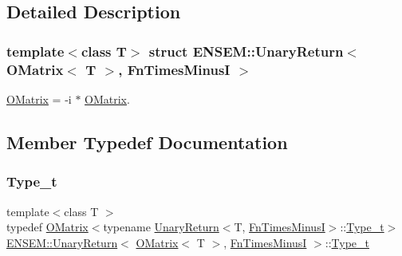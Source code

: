 \subsection{Detailed Description}
\subsubsection*{template$<$class T$>$\newline
struct E\+N\+S\+E\+M\+::\+Unary\+Return$<$ O\+Matrix$<$ T $>$, Fn\+Times\+Minus\+I $>$}

\mbox{\hyperlink{classENSEM_1_1OMatrix}{O\+Matrix}} = -\/i $\ast$ \mbox{\hyperlink{classENSEM_1_1OMatrix}{O\+Matrix}}. 

\subsection{Member Typedef Documentation}
\mbox{\label{structENSEM_1_1UnaryReturn_3_01OMatrix_3_01T_01_4_00_01FnTimesMinusI_01_4_a61e8ab0fd80b071e9277449e6f8bd901}} 
\subsubsection{\texorpdfstring{Type\_t}{Type\_t}\hspace{0.1cm}{\footnotesize\ttfamily [1/3]}}
{\footnotesize\ttfamily template$<$class T $>$ \\
typedef \mbox{\hyperlink{classENSEM_1_1OMatrix}{O\+Matrix}}$<$typename \mbox{\hyperlink{structENSEM_1_1UnaryReturn}{Unary\+Return}}$<$T, \mbox{\hyperlink{structENSEM_1_1FnTimesMinusI}{Fn\+Times\+MinusI}}$>$\+::\mbox{\hyperlink{structENSEM_1_1UnaryReturn_3_01OMatrix_3_01T_01_4_00_01FnTimesMinusI_01_4_a61e8ab0fd80b071e9277449e6f8bd901}{Type\+\_\+t}}$>$ \mbox{\hyperlink{structENSEM_1_1UnaryReturn}{E\+N\+S\+E\+M\+::\+Unary\+Return}}$<$ \mbox{\hyperlink{classENSEM_1_1OMatrix}{O\+Matrix}}$<$ T $>$, \mbox{\hyperlink{structENSEM_1_1FnTimesMinusI}{Fn\+Times\+MinusI}} $>$\+::\mbox{\hyperlink{structENSEM_1_1UnaryReturn_3_01OMatrix_3_01T_01_4_00_01FnTimesMinusI_01_4_a61e8ab0fd80b071e9277449e6f8bd901}{Type\+\_\+t}}}

